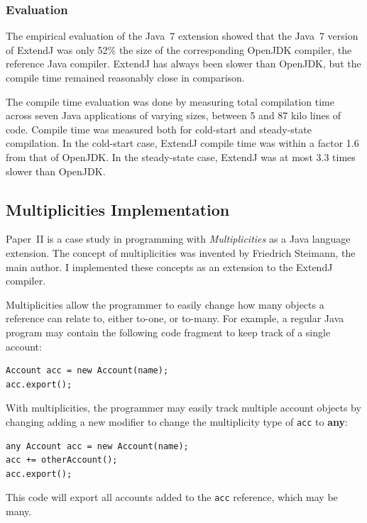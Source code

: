 \documentclass[10pt, twoside, openright]{book}
\begin{document}
\subsubsection{Evaluation}

The empirical evaluation of the Java~7 extension showed that the Java~7 version of ExtendJ
was only 52\% the size of the corresponding OpenJDK compiler, the reference Java compiler.
ExtendJ has always been slower than OpenJDK, but the compile time remained
reasonably close in comparison.

The compile time evaluation was done by measuring total compilation time
across seven Java applications of varying sizes, between 5 and 87 kilo lines of
code.  Compile time was measured both for cold-start and steady-state
compilation. In the cold-start case, ExtendJ compile
time was within a factor 1.6 from that of OpenJDK.
In the steady-state case, ExtendJ was at most 3.3 times slower than OpenJDK.


\subsection{Multiplicities Implementation}

Paper~II is a case study in programming with \emph{Multiplicities} as a Java language extension.
The concept of multiplicities was invented by Friedrich Steimann, the main author. I implemented
these concepts as an extension to the ExtendJ compiler.

Multiplicities allow the programmer to easily change how many objects a reference can relate to,
either to-one, or to-many. For example, a regular Java program may contain the following
code fragment to keep track of a single account:

\begin{lstlisting}
Account acc = new Account(name);
acc.export();
\end{lstlisting}

\noindent
With multiplicities, the programmer may easily track multiple account objects by
changing adding a new modifier to change the multiplicity type of \verb'acc' to \textbf{any}:

\begin{lstlisting}[morekeywords={any}]
any Account acc = new Account(name);
acc += otherAccount();
acc.export();
\end{lstlisting}

\noindent
This code will export all accounts added to the \texttt{acc} reference, which may be many.
\end{document}
